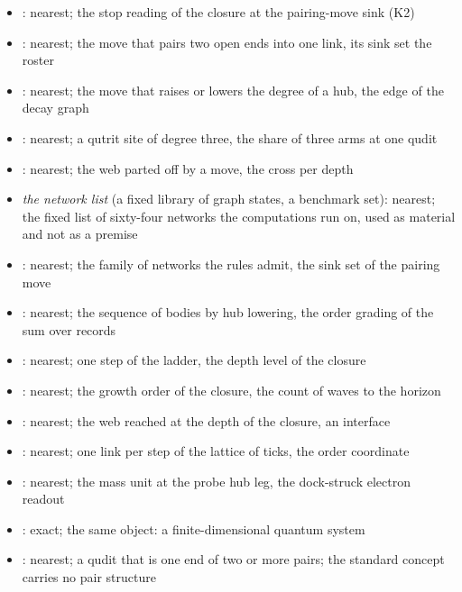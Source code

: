 \begin{chtheorem}
\begin{itemize}
\item {}: nearest; the stop reading of the closure at the pairing-move sink (K2)
\item {}: nearest; the move that pairs two open ends into one link, its sink set the roster
\item {}: nearest; the move that raises or lowers the degree of a hub, the edge of the decay graph
\item {}: nearest; a qutrit site of degree three, the share of three arms at one qudit
\item {}: nearest; the web parted off by a move, the cross per depth
\item \emph{the network list} (a fixed library of graph states, a benchmark set): nearest; the fixed list of sixty-four networks the computations run on, used as material and not as a premise
\item {}: nearest; the family of networks the rules admit, the sink set of the pairing move
\item {}: nearest; the sequence of bodies by hub lowering, the order grading of the sum over records
\item {}: nearest; one step of the ladder, the depth level of the closure
\item {}: nearest; the growth order of the closure, the count of waves to the horizon
\item {}: nearest; the web reached at the depth of the closure, an interface
\item {}: nearest; one link per step of the lattice of ticks, the order coordinate
\item {}: nearest; the mass unit at the probe hub leg, the dock-struck electron readout
\item {}: exact; the same object: a finite-dimensional quantum system
\item {}: nearest; a qudit that is one end of two or more pairs; the standard concept carries no pair structure

\end{itemize}
\end{chtheorem}
